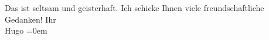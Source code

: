 \begin{ledgroupsized}[t]{13cm}
           \pstart
           Das ist seltsam und geisterhaft.\pend
           \pstart
           Ich schicke Ihnen viele freundschaftliche Gedanken! \pend
           \pstart
           Ihr{\\[\baselineskip]}\spacefill\mbox{Hugo}\pend
           \leftskip=0em{}\endnumbering{}\end{ledgroupsized}  \newcommand{\dateiname}{L02399}\newcommand{\titel}{Hugo Hofmannsthal an Arthur Schnitzler, 15. 5. 1923}\newcommand{\editorInnen}{Martin Anton Müller und Gerd-Hermann Susen}
      